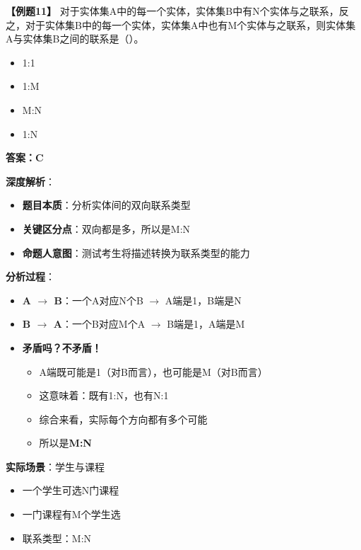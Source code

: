 \documentclass[12pt, a4paper]{article}
\newenvironment{bluebox}[1]{%
  \begin{trivlist}
  \item[\hskip\labelsep \textbf{#1}]
  \setlength{\parskip}{0.5ex}
  \setlength{\itemsep}{0.5ex}
}{%
  \end{trivlist}
  }
\begin{document}
\begin{bluebox}{例题11：联系类型判断}
	\textbf{【例题11】} 对于实体集A中的每一个实体，实体集B中有N个实体与之联系，反之，对于实体集B中的每一个实体，实体集A中也有M个实体与之联系，则实体集A与实体集B之间的联系是（\quad）。

	\begin{itemize}
		\item[A)] 1:1
		\item[B)] 1:M
		\item[C)] M:N
		\item[D)] 1:N
	\end{itemize}

	\textbf{答案：C}

	\textbf{深度解析}：

	\begin{itemize}[leftmargin=*, nosep]
		\item \textbf{题目本质}：分析实体间的双向联系类型
		\item \textbf{关键区分点}：双向都是多，所以是M:N
		\item \textbf{命题人意图}：测试考生将描述转换为联系类型的能力
	\end{itemize}

	\textbf{分析过程}：

	\begin{itemize}[leftmargin=*, nosep]
		\item \textbf{A $\to$ B}：一个A对应N个B $\to$ A端是1，B端是N
		\item \textbf{B $\to$ A}：一个B对应M个A $\to$ B端是1，A端是M
		\item \textbf{矛盾吗？不矛盾！}
		      \begin{itemize}[nosep]
			      \item A端既可能是1（对B而言），也可能是M（对B而言）
			      \item 这意味着：既有1:N，也有N:1
			      \item 综合来看，实际每个方向都有多个可能
			      \item 所以是\textbf{M:N}
		      \end{itemize}
	\end{itemize}

	\textbf{实际场景}：学生与课程

	\begin{itemize}
		\item 一个学生可选N门课程
		\item 一门课程有M个学生选
		\item 联系类型：M:N
	\end{itemize}


\end{bluebox}
\end{document}
